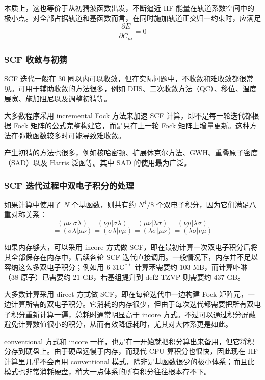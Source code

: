 本质上，这也等价于从初猜波函数出发，不断逼近 HF 能量在轨道系数空间中的极小点。对全部占据轨道和基函数而言，在同时施加轨道正交归一约束时，应满足
\[
\frac{\partial E}{\partial C_{\mu i}}=0
\]

\subsubsection*{SCF 收敛与初猜}

SCF 迭代一般在 30 圈以内可以收敛，但在实际问题中，不收敛和难收敛都很常见。可用于辅助收敛的方法很多，例如 DIIS、二次收敛方法（QC）、移位、温度展宽、施加阻尼以及调整初猜等。

大多数程序采用 incremental Fock 方法来加速 SCF 计算，即不是每一轮迭代都根据 Fock 矩阵的公式完整构建它，而是只在上一轮 Fock 矩阵上增量更新。这种方法在弥散函数较多时可能导致难收敛。

产生初猜的方法也很多，例如核哈密顿、扩展休克尔方法、GWH、重叠原子密度（SAD）以及 Harris 泛函等。其中 SAD 的使用最为广泛。

\subsubsection*{SCF 迭代过程中双电子积分的处理}

如果计算中使用了 $N$ 个基函数，则共有约 $N^4/8$ 个双电子积分，因为它们满足八重对称关系：
\[
(\mu\nu\vert \sigma\lambda)
=(\nu\mu\vert \sigma\lambda)
=(\mu\nu\vert \lambda\sigma)
=(\nu\mu\vert \lambda\sigma)
\]
\[
=(\sigma\lambda\vert \mu\nu)
=(\sigma\lambda\vert \nu\mu)
=(\lambda\sigma\vert \mu\nu)
=(\lambda\sigma\vert \nu\mu)
\]

如果内存够大，可以采用 incore 方式做 SCF，即在最初计算一次双电子积分后将其全部保存在内存中，后续各轮 SCF 迭代直接调用。一般情况下，内存并不足以容纳这么多双电子积分；例如用 6-31G$^{**}$ 计算苯需要约 103 MB，而计算卟啉（38 原子）已需要约 21 GB，若基组提升到 def2-TZVP 则需要约 437 GB。

大多数计算采用 direct 方式做 SCF，即在每轮迭代中一边构建 Fock 矩阵元，一边计算所需的双电子积分。它消耗的内存很少，但由于每次迭代都需要把所有双电子积分重新计算一遍，总耗时通常明显高于 incore 方式。不过可以通过积分屏蔽避免计算数值很小的积分，从而有效降低耗时，尤其对大体系更是如此。

conventional 方式和 incore 一样，也是在一开始就把积分算出来备用，但它将积分存到硬盘上。由于硬盘远慢于内存，而现代 CPU 算积分也很快，因此现在 HF 计算里几乎不会再用 conventional 模式，除非是基函数很少的极小体系；而且此模式也非常消耗硬盘，稍大一点体系的所有积分往往根本存不下。

